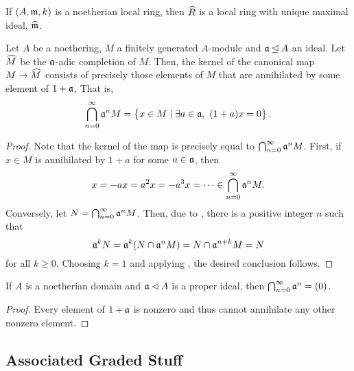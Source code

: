 \begin{corollary}
    If $(A,\mathfrak m,k)$ is a noetherian local ring, then $\widehat{R}$ is a local ring with unique maximal ideal, $\widehat{\mathfrak m}$.
\end{corollary}

\begin{theorem}
    Let $A$ be a noethering, $M$ a finitely generated $A$-module and $\mathfrak a\unlhd A$ an ideal. Let $\widehat{M}$ be the $\mathfrak a$-adic completion of $M$. Then, the kernel of the canonical map $M\to\widehat{M}$ consists of precisely those elements of $M$ that are annihilated by some element of $1 + \mathfrak a$. That is, 
    \begin{equation*}
        \bigcap_{n = 0}^\infty\mathfrak a^n M = \left\{x\in M\mid\exists a\in\mathfrak a,~(1 + a)x = 0\right\}.
    \end{equation*}
\end{theorem}
\begin{proof}
    Note that the kernel of the map is precisely equal to $\bigcap_{n = 0}^\infty\mathfrak a^n M$. First, if $x\in M$ is annihilated by $1 + a$ for some $a\in\mathfrak a$, then 
    \begin{equation*}
        x = -ax = a^2x = -a^3x = \cdots\in\bigcap_{n = 0}^\infty\mathfrak a^n M.
    \end{equation*}
    Conversely, let $N = \bigcap_{n = 0}^\infty\mathfrak a^n M$. Then, due to , there is a positive integer $n$ such that 
    \begin{equation*}
        \mathfrak a^k N = \mathfrak a^{k}(N\cap\mathfrak a^n M) = N\cap\mathfrak a^{n + k}M = N
    \end{equation*}
    for all $k\ge 0$. Choosing $k = 1$ and applying , the desired conclusion follows.
\end{proof}

\begin{corollary}
    If $A$ is a noetherian domain and $\mathfrak a\lhd A$ is a proper ideal, then $\bigcap_{n = 0}^\infty\mathfrak a^n = (0)$.
\end{corollary}
\begin{proof}
    Every element of $1 + \mathfrak a$ is nonzero and thus cannot annihilate any other nonzero element.
\end{proof}

\subsection{Associated Graded Stuff}

